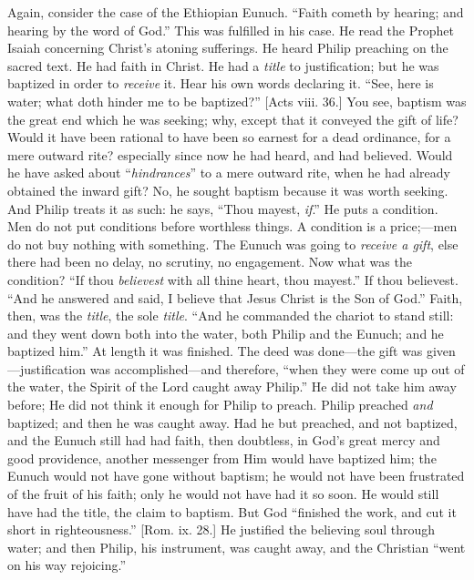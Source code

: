 Again, consider the case of the Ethiopian Eunuch. ``Faith
cometh by hearing; and hearing by the word of God.'' This was
fulfilled in his case. He read the Prophet Isaiah concerning Christ's
atoning sufferings. He heard Philip preaching on the sacred text. He
had faith in Christ. He had a \emph{title} to justification; but he
was baptized in order to \emph{receive} it. Hear his own words
declaring it. ``See, here is water; what doth hinder me to be
baptized?'' [Acts viii. 36.] You see, baptism was the great end
which he was seeking; why, except that it conveyed the gift of life?
Would it have been rational to have been so earnest for a dead
ordinance, for a mere outward rite? especially since now he had heard,
and had believed. Would he have asked about ``\emph{hindrances}''
to a mere outward rite, when he had already obtained the inward gift?
No, he sought baptism because it was worth seeking. And Philip treats
it as such: he says, ``Thou mayest, \emph{if}.'' He puts a
condition. Men do not put conditions before worthless things. A
condition is a price;—men do not buy nothing with something. The
Eunuch was going to \emph{receive a gift}, else there had been no
delay, no scrutiny, no engagement. Now what was the condition?
``If thou \emph{believest} with all thine heart, thou mayest.''
If thou believest. ``And he answered and said, I believe that
Jesus Christ is the Son of God.'' Faith, then, was the \emph{title},
the sole \emph{title}. ``And he commanded the chariot to stand
still: and they went down both into the water, both Philip and the
Eunuch; and he baptized him.'' At length it was finished. The deed
was done—the gift was given—justification was accomplished—and
therefore, ``when they were come up out of the water, the Spirit
of the Lord caught away Philip.'' He did not take him away before;
He did not think it enough for Philip to preach. Philip preached \emph{and}
baptized; and then he was caught away. Had he but preached, and not
baptized, and the Eunuch still had had faith, then doubtless, in God's
great mercy and good providence, another messenger from Him would have
baptized him; the Eunuch would not have gone without baptism; he would
not have been frustrated of the fruit of his faith; only he would not
have had it so soon. He would still have had the title, the claim to
baptism. But God ``finished the work, and cut it short in
righteousness.'' [Rom. ix. 28.] He justified the believing soul
through water; and then Philip, his instrument, was caught away, and
the Christian ``went on his way rejoicing.''

